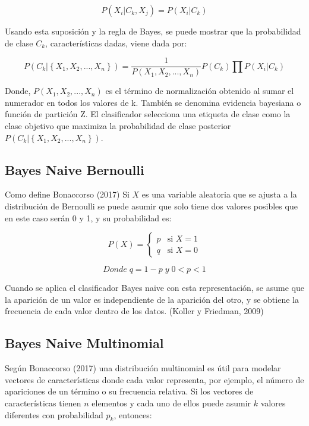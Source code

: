 	\[P\left(X_{i}|C_{k},X_{j}\right)=P\left(X_{i}|C_{k}\right)
\]

Usando esta suposición y la regla de Bayes, se puede mostrar que la probabilidad de clase $C_{k}$, características dadas, viene dada por:

	\[P\left(C_{k}|\left\{X_{1},X_{2},...,X_{n}\right\}\right)=\frac{1}{P\left(X_{1},X_{2},...,X_{n}\right)}P\left(C_{k}\right)\prod{P\left(X_{i}|C_{k}\right)}
\]

Donde, $P\left(X_{1},X_{2},...,X_{n}\right)$ es el término de normalización obtenido al sumar el numerador en todos los valores de k. También se denomina evidencia bayesiana o función de partición Z. El clasificador selecciona una etiqueta de clase como la clase objetivo que maximiza la probabilidad de clase posterior $P\left(C_{k}|\left\{X_{1},X_{2},...,X_{n}\right\}\right)$.

\subsection{Bayes Naive Bernoulli}

Como define Bonaccorso (2017) Si $X$ es una variable aleatoria que se ajusta a la distribución de Bernoulli se puede asumir que solo tiene dos valores posibles que en este caso serán 0 y 1, y su probabilidad es:

 \[P\left(X\right)=\begin{cases}
      p & \mbox{si } X = 1   \\
      q & \mbox{si } X = 0
   \end{cases}\]

 \[Donde\;q = 1 - p\;y\;0 < p < 1\]

Cuando se aplica el clasificador Bayes naive con esta representación, se asume que la aparición de un valor es independiente de la aparición del otro, y se obtiene la frecuencia de cada valor dentro de los datos. (Koller y Friedman, 2009)

\subsection{Bayes Naive Multinomial}

Según Bonaccorso (2017) una distribución multinomial es útil para modelar vectores de características donde cada valor representa, por ejemplo, el número de apariciones de un término o su frecuencia relativa. Si los vectores de características tienen $n$ elementos y cada uno de ellos puede asumir $k$ valores diferentes con probabilidad $p_{k}$, entonces:

